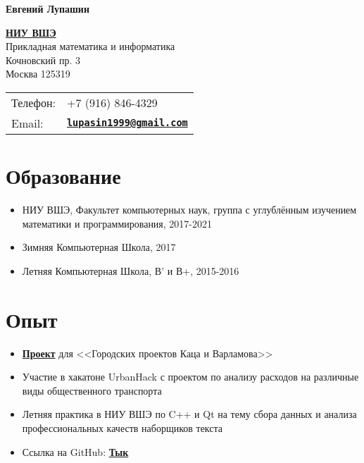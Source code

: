 \documentclass[letterpaper]{article}
\def\name{Евгений Лупашин}
\let\oldhref\href
\renewcommand{\href}[2]{\oldhref{#1}{\bfseries#2}}
\begin{document}
{\huge \textbf{\name}}


\vspace{0.1in}

\begin{minipage}{0.45\linewidth}
  \href{https://www.hse.ru/}{НИУ ВШЭ} \\
  Прикладная математика и информатика \\
  Кочновский пр. 3 \\
  Москва 125319
\end{minipage}
\begin{minipage}{0.45\linewidth}
  \begin{tabular}{ll}
    Телефон: & +7 (916) 846-4329 \\
    Email: & \href{mailto:lupasin1999@gmail.com}{\tt lupasin1999@gmail.com} \\
  \end{tabular}
\end{minipage}


\section*{Образование}
\begin{itemize}
	\item НИУ ВШЭ, Факультет компьютерных наук, группа с углублённым изучением математики и программирования, 2017-2021
	\item Зимняя Компьютерная Школа, 2017
	\item Летняя Компьютерная Школа, В' и В+, 2015-2016
\end{itemize}


\section*{Опыт}
\begin{itemize}
	\item \href{https://city4people.ru/post/kalkulyator-elektrobusov.html}{Проект} для <<Городских проектов Каца и Варламова>>
	\item Участие в хакатоне UrbanHack с проектом по анализу расходов на различные виды общественного транспорта
	\item Летняя практика в НИУ ВШЭ по C++ и Qt на тему сбора данных и анализа профессиональных качеств наборщиков текста
	\item Ссылка на GitHub: \href{https://github.com/PipeKnight}{Тык}
\end{itemize}
\end{document}
